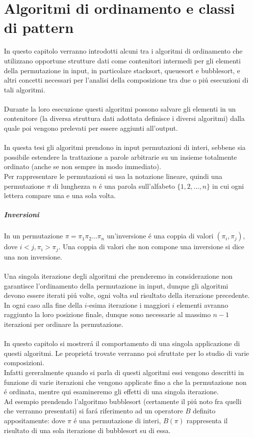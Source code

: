 \chapter{Algoritmi di ordinamento e classi di pattern}
In questo capitolo verranno introdotti alcuni tra i algoritmi di ordinamento che utilizzano opportune strutture dati come contenitori intermedi per gli elementi della permutazione in input, in particolare stacksort,
queuesort e bubblesort, e altri concetti necessari per l'analisi della composizione tra due o pi\'u esecuzioni di tali algoritmi.\\\\
Durante la loro esecuzione questi algoritmi possono salvare gli elementi in un contenitore (la diversa struttura dati adottata definisce i diversi algoritmi) dalla quale poi vengono prelevati per essere aggiunti all'output.\\\\
In questa tesi gli algoritmi prendono in input permutazioni di interi, sebbene sia possibile estendere la trattazione a parole arbitrarie su un insieme totalmente ordinato (anche se non sempre in modo immediato).\\
Per rappresentare le permutazioni si usa la notazione lineare, quindi una permutazione $\pi$ di lunghezza $n$ \'e una parola sull'alfabeto $\{1, 2, \dots, n\}$ in cui ogni lettera compare una e una sola volta.
\paragraph*{Inversioni} In un permutazione $\pi = \pi_1\pi_2\dots\pi_n$ un'inversione \'e una coppia di valori $(\pi_i,\pi_j)$, dove $i<j, \pi_i>\pi_j$. Una coppia di valori che non compone una inversione si dice una non inversione.\\
\\Una singola iterazione degli algoritmi che prenderemo in considerazione non garantisce l'ordinamento della permutazione in input,
dunque gli algoritmi devono essere iterati pi\'u volte, ogni volta sul risultato della iterazione precedente. In ogni caso alla fine della $i$-esima
iterazione i maggiori $i$ elementi avranno raggiunto la loro posizione finale, 
dunque sono necessarie al massimo $n-1$ iterazioni per ordinare la permutazione.\\\\
In questo capitolo si mostrer\'a il comportamento di una singola applicazione di questi algoritmi. Le propriet\'a trovate verranno poi sfruttate per lo studio di varie composizioni.\\
Infatti gereralmente quando si parla di questi algoritmi essi vengono descritti in funzione di varie iterazioni che vengono applicate fino a che la permutazione non \'e ordinata, mentre qui esamineremo gli effetti di una singola iterazione.\\
Ad esempio prendendo l'algoritmo bubblesort (certamente il pi\'u noto fra quelli che verranno presentati) si far\'a riferimento ad un operatore $B$ definito appositamente: dove $\pi$ \'e una permutazione di
interi, $B(\pi)$ rappresenta il risultato di una sola iterazione di bubblesort su di essa.
